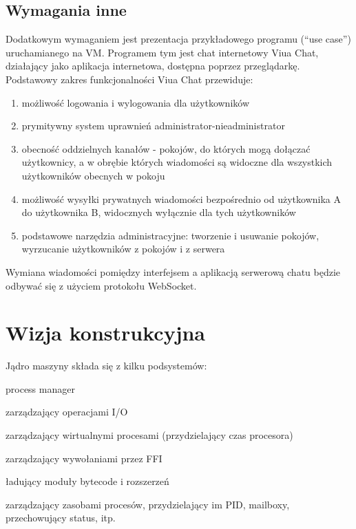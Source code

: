 \documentclass[11pt,oneside,a4paper,titlepage,onecolumn]{article}
\begin{document}
\subsection{Wymagania inne}

Dodatkowym wymaganiem jest prezentacja przykładowego programu (``use case'') uruchamianego na VM.
Programem tym jest chat internetowy Viua Chat, działający jako aplikacja internetowa, dostępna poprzez przeglądarkę. Podstawowy zakres funkcjonalności Viua Chat przewiduje:

\begin{enumerate}
    \item możliwość logowania i wylogowania dla użytkowników
    \item prymitywny system uprawnień administrator-nieadministrator
    \item obecność oddzielnych kanałów - pokojów, do których mogą dołączać użytkownicy, a w obrębie których wiadomości są widoczne dla wszystkich użytkowników obecnych w pokoju
    \item możliwość wysyłki prywatnych wiadomości bezpośrednio od użytkownika A do użytkownika B, widocznych wyłącznie dla tych użytkowników
    \item podstawowe narzędzia administracyjne: tworzenie i usuwanie pokojów, wyrzucanie użytkowników z pokojów i z serwera
\end{enumerate}

Wymiana wiadomości pomiędzy interfejsem a aplikacją serwerową chatu będzie odbywać się z użyciem protokołu WebSocket. 

\section{Wizja konstrukcyjna}

Jądro maszyny składa się z kilku podsystemów:

\begin{labeling}{process manager}
\item [scheduler IO] zarządzający operacjami I/O
\item [scheduler VP] zarządzający wirtualnymi procesami (przydzielający czas procesora)
\item [scheduler FFI] zarządzający wywołaniami przez FFI
\item [loader] ładujący moduły bytecode i rozszerzeń
\item [process manager] zarządzający zasobami procesów, przydzielający im PID, mailboxy, przechowujący status,
    itp.
\end{labeling}
\end{document}
